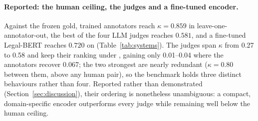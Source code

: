 

\paragraph{Reported: the human ceiling, the judges and a fine-tuned encoder.}
Against the frozen gold, trained annotators reach $\kappa = 0.859$ in
leave-one-annotator-out, the best of the four LLM judges reaches $0.581$, and a
fine-tuned Legal-BERT reaches $0.720$ on  (Table~\ref{tab:systems}).
The judges span $\kappa$ from 0.27 to 0.58 and keep their ranking under ,
gaining only 0.01--0.04 where the annotators recover 0.067; the two strongest are
nearly redundant ($\kappa = 0.80$ between them, above any human pair), so the
benchmark holds three distinct behaviours rather than four.
Reported rather than demonstrated (Section~\ref{sec:discussion}), their ordering
is nonetheless unambiguous: a compact, domain-specific encoder outperforms every
judge while remaining well below the human ceiling.
